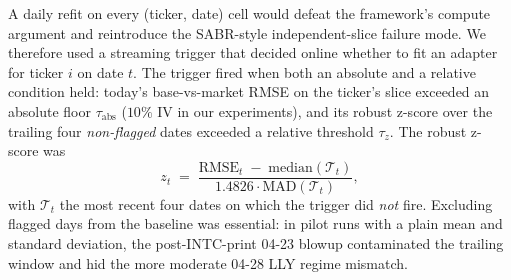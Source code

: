 A daily refit on every (ticker, date) cell would defeat the framework's compute argument and reintroduce the SABR-style independent-slice failure mode. We therefore used a streaming trigger that decided online whether to fit an adapter for ticker $i$ on date $t$. The trigger fired when both an absolute and a relative condition held: today's base-vs-market RMSE on the ticker's slice exceeded an absolute floor $\tau_{\text{abs}}$ ($10\%$ IV in our experiments), and its robust z-score over the trailing four \emph{non-flagged} dates exceeded a relative threshold $\tau_z$. The robust z-score was
\begin{equation}\label{eq:trigger_z}
    z_t \;=\; \frac{\text{RMSE}_t \;-\; \mathrm{median}(\mathcal{T}_t)}{1.4826 \cdot \mathrm{MAD}(\mathcal{T}_t)},
\end{equation}
with $\mathcal{T}_t$ the most recent four dates on which the trigger did \emph{not} fire. Excluding flagged days from the baseline was essential: in pilot runs with a plain mean and standard deviation, the post-INTC-print 04-23 blowup contaminated the trailing window and hid the more moderate 04-28 LLY regime mismatch.
